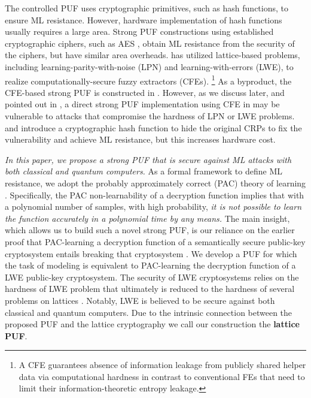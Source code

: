 The controlled PUF \cite{gassend2008controlled} uses cryptographic primitives, such as hash functions, to ensure ML resistance. 
However, hardware implementation of hash functions usually requires a large area.
Strong PUF constructions using established cryptographic ciphers, such as AES \cite{bhargava2014efficient}, obtain ML resistance from the security of the ciphers, but have similar area overheads. 
\cite{fuller2013computational} has utilized lattice-based problems, including learning-parity-with-noise (LPN) and learning-with-errors (LWE), to realize computationally-secure fuzzy extractors (CFEs).
\footnote{A CFE guarantees absence of information leakage from publicly shared helper data via computational hardness in contrast to conventional FEs that need to limit their information-theoretic entropy leakage.} 
As a byproduct, the CFE-based strong PUF is constructed in \cite{herder2017trapdoor,jin2017fpga}.
However, as we discuss later, and pointed out in \cite{herder2017trapdoor,jin2017fpga}, a direct strong PUF implementation using CFE in \cite{fuller2013computational} may be vulnerable to attacks that compromise the hardness of LPN or LWE problems. 
\cite{herder2017trapdoor} and \cite{jin2017fpga} introduce a cryptographic hash function to hide the original CRPs to fix the vulnerability and achieve ML resistance, but this increases hardware cost.


\emph{In this paper, we propose a strong PUF that is secure against ML attacks with both classical and quantum computers.} \cite{wang2020lattice} 
As a formal framework to define ML resistance, we adopt the probably approximately correct (PAC) theory of learning \cite{mohri2012foundations}. 
Specifically, the PAC non-learnability of a decryption function implies that with a polynomial number of samples, with high probability, \emph{it is not possible to learn the function accurately in a polynomial time by any means.}
The main insight, which allows us to build such a novel strong PUF, is our reliance on the earlier proof that PAC-learning a decryption function of a semantically secure public-key cryptosystem entails breaking that cryptosystem \cite{kearns1994cryptographic, klivans2006cryptographic}.
We develop a PUF for which the task of modeling is equivalent to PAC-learning the decryption function of a LWE public-key cryptosystem.
The security of LWE cryptosystems relies on the hardness of LWE problem that ultimately is reduced to the hardness of several problems on lattices \cite{regev2009lattices}. 
Notably, LWE is believed to be secure against both classical and quantum computers.
Due to the intrinsic connection between the proposed PUF and the lattice cryptography we call our construction the \textbf{lattice PUF}.

